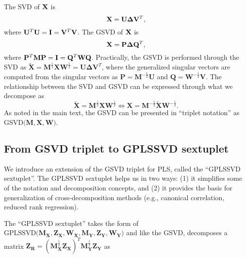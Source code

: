 \documentclass[12pt]{article}
\begin{document}
The SVD of \({\bf X}\) is \begin{equation}
{\bf X} = {\bf U}{\boldsymbol \Delta}{\bf V}^{T},
\end{equation} where
\({\bf U}^{T}{\bf U} = {\bf I} = {\bf V}^{T}{\bf V}\). The GSVD of
\({\bf X}\) is \begin{equation}
{\bf X} = {\bf P}{\boldsymbol \Delta}{\bf Q}^{T},
\end{equation} where
\({\bf P}^{T}{\bf M}{\bf P} = {\bf I} = {\bf Q}^{T}{\bf W}{\bf Q}\).
Practically, the GSVD is performed through the SVD as
\(\widetilde{\mathbf X} = {\mathbf M}^{\frac{1}{2}}{\mathbf X}{\mathbf W}^{\frac{1}{2}} = {\mathbf U} {\boldsymbol \Delta} {\mathbf V}^{T}\),
where the generalized singular vectors are computed from the singular
vectors as \({\mathbf P} = {\mathbf M}^{-\frac{1}{2}}{\mathbf U}\) and
\({\mathbf Q} = {\mathbf W}^{-\frac{1}{2}}{\mathbf V}\). The
relationship between the SVD and GSVD can be expressed through what we
decompose as \begin{equation}
\widetilde{\mathbf X} = {\mathbf M}^{\frac{1}{2}}{\mathbf X}{\mathbf W}^{\frac{1}{2}} \Longleftrightarrow {\mathbf X} = {\mathbf M}^{-\frac{1}{2}}\widetilde{\mathbf X}{\mathbf W}^{-\frac{1}{2}}.
\end{equation} As noted in the main text, the GSVD can be presented in
``triplet notation'' as
\(\mathrm{GSVD(}{\mathbf M}, {\mathbf X}, {\mathbf W}\mathrm{)}\).

\hypertarget{from-gsvd-triplet-to-gplssvd-sextuplet}{%
\subsection{From GSVD triplet to GPLSSVD
sextuplet}\label{from-gsvd-triplet-to-gplssvd-sextuplet}}

We introduce an extension of the GSVD triplet for PLS, called the
``GPLSSVD sextuplet''. The GPLSSVD sextuplet helps us in two ways: (1)
it simplifies some of the notation and decomposition concepts, and (2)
it provides the basis for generalization of cross-decomposition methods
(e.g., canonical correlation, reduced rank regression).

The ``GPLSSVD sextuplet'' takes the form of
\(\mathrm{GPLSSVD(} {\mathbf M}_{\mathbf X}, {\mathbf Z}_{\mathbf X}, {\mathbf W}_{\mathbf X}, {\mathbf M}_{\mathbf Y}, {\mathbf Z}_{\mathbf Y}, {\mathbf W}_{\mathbf Y} \mathrm{)}\)
and like the GSVD, decomposes a matrix
\({\mathbf Z}_{\mathbf R} = ({\mathbf M}_{\mathbf X}^{\frac{1}{2}}{\mathbf Z}_{\mathbf X})^{T} {\mathbf M}_{\mathbf Y}^{\frac{1}{2}} {\mathbf Z}_{\mathbf Y}\)
as
\end{document}
